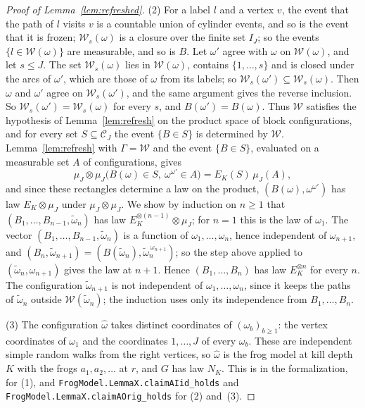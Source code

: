 \documentclass[11pt]{amsart}
\theoremstyle{definition}
\numberwithin{equation}{section}
\newcommand{\cC}{\mathcal{C}}
\newcommand{\cW}{\mathcal{W}}
\begin{document}
\begin{proof}[Proof of Lemma~\ref{lem:refreshed}]
(2) For a label $l$ and a vertex $v$, the event that the path of $l$ visits $v$ is a countable union of cylinder events, and so is the event that it is frozen; $\cW_s(\omega)$ is a closure over the finite set $I_J$; so the events $\{l\in\cW(\omega)\}$ are measurable, and so is $B$. Let $\omega'$ agree with $\omega$ on $\cW(\omega)$, and let $s\le J$. The set $\cW_s(\omega)$ lies in $\cW(\omega)$, contains $\{1,\dots,s\}$ and is closed under the arcs of $\omega'$, which are those of $\omega$ from its labels; so $\cW_s(\omega')\subseteq\cW_s(\omega)$. Then $\omega$ and $\omega'$ agree on $\cW_s(\omega')$, and the same argument gives the reverse inclusion. So $\cW_s(\omega')=\cW_s(\omega)$ for every $s$, and $B(\omega')=B(\omega)$. Thus $\cW$ satisfies the hypothesis of Lemma~\ref{lem:refresh} on the product space of block configurations, and for every set $S\subseteq\cC_J$ the event $\{B\in S\}$ is determined by $\cW$. Lemma~\ref{lem:refresh} with $\Gamma=\cW$ and the event $\{B\in S\}$, evaluated on a measurable set $A$ of configurations, gives
\[
\mu_J\otimes\mu_J\bigl(B(\omega)\in S,\ \omega^{\omega'}\in A\bigr)=E_K(S)\,\mu_J(A),
\]
and since these rectangles determine a law on the product, $(B(\omega),\omega^{\omega'})$ has law $E_K\otimes\mu_J$ under $\mu_J\otimes\mu_J$. We show by induction on $n\ge1$ that $(B_1,\dots,B_{n-1},\tilde\omega_n)$ has law $E_K^{\otimes(n-1)}\otimes\mu_J$; for $n=1$ this is the law of $\omega_1$. The vector $(B_1,\dots,B_{n-1},\tilde\omega_n)$ is a function of $\omega_1,\dots,\omega_n$, hence independent of $\omega_{n+1}$, and $(B_n,\tilde\omega_{n+1})=(B(\tilde\omega_n),\tilde\omega_n^{\,\omega_{n+1}})$; so the step above applied to $(\tilde\omega_n,\omega_{n+1})$ gives the law at $n+1$. Hence $(B_1,\dots,B_n)$ has law $E_K^{\otimes n}$ for every $n$. The configuration $\tilde\omega_{n+1}$ is not independent of $\omega_1,\dots,\omega_n$, since it keeps the paths of $\tilde\omega_n$ outside $\cW(\tilde\omega_n)$; the induction uses only its independence from $B_1,\dots,B_n$.

(3) The configuration $\hat\omega$ takes distinct coordinates of $(\omega_b)_{b\ge1}$: the vertex coordinates of $\omega_1$ and the coordinates $1,\dots,J$ of every $\omega_b$. These are independent simple random walks from the right vertices, so $\hat\omega$ is the frog model at kill depth $K$ with the frogs $a_1,a_2,\dots$ at $r$, and $G$ has law $N_K$. This is  in the formalization, for (1), and \texttt{FrogModel.LemmaX.claimAIid\_holds} and \texttt{FrogModel.LemmaX.claimAOrig\_holds} for (2) and~(3).
\end{proof}
\end{document}
